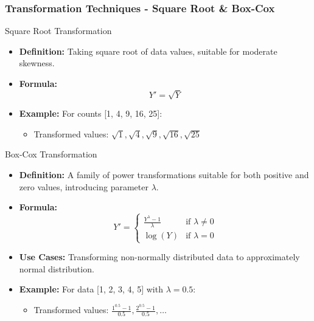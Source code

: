 \documentclass[aspectratio=169]{beamer}
\begin{document}
\begin{frame}[fragile]
    \frametitle{Transformation Techniques - Square Root \& Box-Cox}
    \begin{block}{Square Root Transformation}
        \begin{itemize}
            \item \textbf{Definition:} Taking square root of data values, suitable for moderate skewness.
            \item \textbf{Formula:}
            \begin{equation}
                Y' = \sqrt{Y}
            \end{equation}
            \item \textbf{Example:} For counts [1, 4, 9, 16, 25]:
            \begin{itemize}
                \item Transformed values: \( \sqrt{1}, \sqrt{4}, \sqrt{9}, \sqrt{16}, \sqrt{25} \)
            \end{itemize}
        \end{itemize}
    \end{block}

    \begin{block}{Box-Cox Transformation}
        \begin{itemize}
            \item \textbf{Definition:} A family of power transformations suitable for both positive and zero values, introducing parameter \( \lambda \).
            \item \textbf{Formula:}
            \begin{equation}
            Y' = 
            \begin{cases} 
            \frac{Y^\lambda - 1}{\lambda} & \text{if } \lambda \neq 0 \\
            \log(Y) & \text{if } \lambda = 0 
            \end{cases}
            \end{equation}
            \item \textbf{Use Cases:} Transforming non-normally distributed data to approximately normal distribution.
            \item \textbf{Example:} For data [1, 2, 3, 4, 5] with \( \lambda = 0.5 \):
            \begin{itemize}
                \item Transformed values: \( \frac{1^{0.5} - 1}{0.5}, \frac{2^{0.5} - 1}{0.5}, \ldots \)
            \end{itemize}
        \end{itemize}
    \end{block}
\end{frame}
\end{document}
